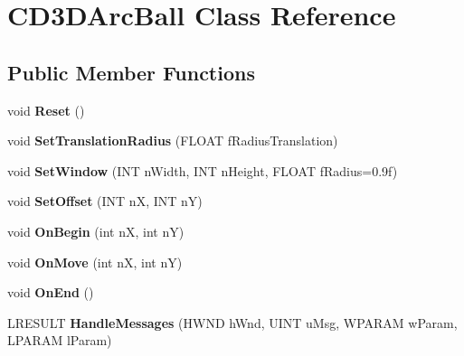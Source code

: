 \hypertarget{class_c_d3_d_arc_ball}{\section{C\+D3\+D\+Arc\+Ball Class Reference}
\label{class_c_d3_d_arc_ball}
}
\subsection*{Public Member Functions}
\begin{DoxyCompactItemize}
\item 
\hypertarget{class_c_d3_d_arc_ball_a8e25a9fee7bdad867cf8feb623a3dd1f}{void {\bfseries Reset} ()}\label{class_c_d3_d_arc_ball_a8e25a9fee7bdad867cf8feb623a3dd1f}

\item 
\hypertarget{class_c_d3_d_arc_ball_a72c32f8aa6d34f89765ea75139f65b87}{void {\bfseries Set\+Translation\+Radius} (F\+L\+O\+A\+T f\+Radius\+Translation)}\label{class_c_d3_d_arc_ball_a72c32f8aa6d34f89765ea75139f65b87}

\item 
\hypertarget{class_c_d3_d_arc_ball_aac7e91ff2fb6770b18b62b7eaecba6c4}{void {\bfseries Set\+Window} (I\+N\+T n\+Width, I\+N\+T n\+Height, F\+L\+O\+A\+T f\+Radius=0.\+9f)}\label{class_c_d3_d_arc_ball_aac7e91ff2fb6770b18b62b7eaecba6c4}

\item 
\hypertarget{class_c_d3_d_arc_ball_a781313e96e3a63e69facead4ca70cf79}{void {\bfseries Set\+Offset} (I\+N\+T n\+X, I\+N\+T n\+Y)}\label{class_c_d3_d_arc_ball_a781313e96e3a63e69facead4ca70cf79}

\item 
\hypertarget{class_c_d3_d_arc_ball_a86882ddd7ee5330641a57b24fd8006f3}{void {\bfseries On\+Begin} (int n\+X, int n\+Y)}\label{class_c_d3_d_arc_ball_a86882ddd7ee5330641a57b24fd8006f3}

\item 
\hypertarget{class_c_d3_d_arc_ball_aab40fc2905516034b37ba0d14b6a6a76}{void {\bfseries On\+Move} (int n\+X, int n\+Y)}\label{class_c_d3_d_arc_ball_aab40fc2905516034b37ba0d14b6a6a76}

\item 
\hypertarget{class_c_d3_d_arc_ball_abf187ce0c2926384d28166ee30df6c24}{void {\bfseries On\+End} ()}\label{class_c_d3_d_arc_ball_abf187ce0c2926384d28166ee30df6c24}

\item 
\hypertarget{class_c_d3_d_arc_ball_ac2f906cc45310c55c03b6403c22817ca}{L\+R\+E\+S\+U\+L\+T {\bfseries Handle\+Messages} (H\+W\+N\+D h\+Wnd, U\+I\+N\+T u\+Msg, W\+P\+A\+R\+A\+M w\+Param, L\+P\+A\+R\+A\+M l\+Param)}\label{class_c_d3_d_arc_ball_ac2f906cc45310c55c03b6403c22817ca}


\end{DoxyCompactItemize}
